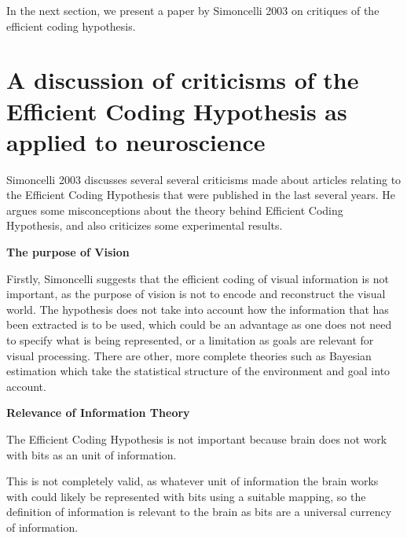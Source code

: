 \documentclass[twoside]{article}
\begin{document}
\begin{multicols}{2}
In the next section, we present a paper by Simoncelli 2003 on critiques of the efficient coding hypothesis. 







\section{A discussion of criticisms of the Efficient Coding Hypothesis as applied to neuroscience}

Simoncelli 2003 discusses several several criticisms made about articles relating to the Efficient Coding Hypothesis that were published in the last several years. He argues some misconceptions about the theory behind Efficient Coding Hypothesis, and also criticizes some experimental results.

\noindent\textbf{The purpose of Vision}

Firstly, Simoncelli suggests that the efficient coding of visual information is not important, as the purpose of vision is not to encode and reconstruct the visual world. The hypothesis does not take into account how the information that has been extracted is to be used, which could be an advantage as one does not need to specify what is being represented, or a limitation as goals are relevant for visual processing. There are other, more complete theories such as Bayesian estimation which take the statistical structure of the environment and goal into account.

\noindent\textbf{Relevance of Information Theory}

The Efficient Coding Hypothesis is not important because brain does not work with bits as an unit of information. 

This is not completely valid, as whatever unit of information the brain works with could likely be represented with bits using a suitable mapping, so the definition of information is relevant to the brain as bits are a universal currency of information.


\end{multicols}
\end{document}
